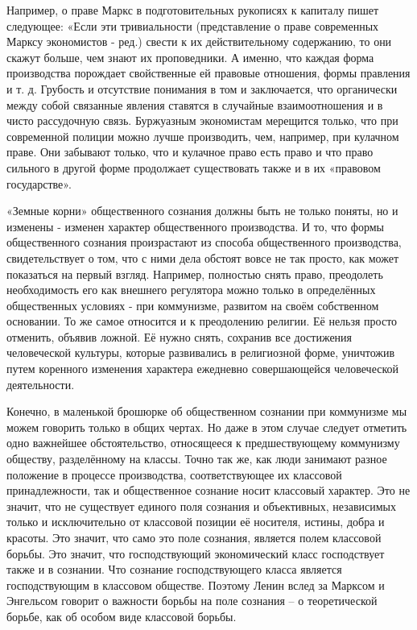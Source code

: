 \documentclass[12pt,a4paper,openany]{book}
\begin{document}
Например, о праве Маркс в подготовительных рукописях к капиталу пишет следующее: «Если эти тривиальности (представление о праве современных Марксу экономистов - ред.) свести к их действительному содержанию, то они скажут больше, чем знают их проповедники. А именно, что каждая форма производства порождает свойственные ей правовые отношения, формы правления и т. д. Грубость и отсутствие понимания в том и заключается, что органически между собой связанные явления ставятся в случайные взаимоотношения и в чисто рассудочную связь. Буржуазным экономистам мерещится только, что при современной полиции можно лучше производить, чем, например, при кулачном праве. Они забывают только, что и кулачное право есть право и что право сильного в другой форме продолжает существовать также и в их «правовом государстве».

«Земные корни» общественного сознания должны быть не только поняты, но и изменены - изменен характер общественного производства. И то, что формы общественного сознания произрастают из способа общественного производства, свидетельствует о том, что с ними дела обстоят вовсе не так просто, как может показаться на первый взгляд. Например, полностью снять право, преодолеть необходимость его как внешнего регулятора можно только в определённых общественных условиях - при коммунизме, развитом на своём собственном основании. То же самое относится и к преодолению религии. Её нельзя просто отменить, объявив ложной. Её нужно снять, сохранив все достижения человеческой культуры, которые развивались в религиозной форме, уничтожив путем коренного изменения характера ежедневно совершающейся человеческой деятельности.

Конечно, в маленькой брошюрке об общественном сознании при коммунизме мы можем говорить только в общих чертах. Но даже в этом случае следует отметить одно важнейшее обстоятельство, относящееся к предшествующему коммунизму обществу, разделённому на классы. Точно так же, как люди занимают разное положение в процессе производства, соответствующее их классовой принадлежности, так и общественное сознание носит классовый характер. Это не значит, что не существует единого поля сознания и объективных, независимых только и исключительно от классовой позиции её носителя, истины, добра и красоты. Это значит, что само это поле сознания, является полем классовой борьбы. Это значит, что господствующий экономический класс господствует также и в сознании. Что сознание господствующего класса является господствующим в классовом обществе. Поэтому Ленин вслед за Марксом и Энгельсом говорит о важности борьбы на поле сознания – о теоретической борьбе, как об особом виде классовой борьбы.
\end{document}
